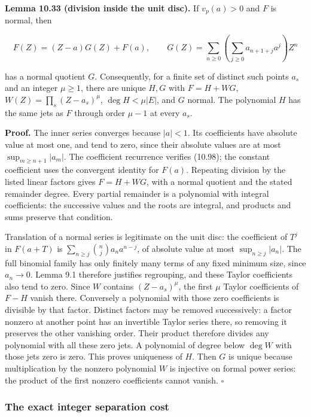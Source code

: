\documentclass[
  11pt,
  a4paper,
]{article}
\begin{document}
\textbf{Lemma 10.33 (division inside the unit disc).} If \(v_p(a)>0\)
and \(F\) is normal, then

\[
F(Z)=(Z-a)G(Z)+F(a),\qquad
G(Z)=\sum_{n\ge0}\left(\sum_{j\ge0}a_{n+1+j}a^j\right)Z^n
\tag{10.98}
\]

has a normal quotient \(G\). Consequently, for a finite set of distinct
such points \(a_s\) and an integer \(\mu\ge1\), there are unique \(H,G\)
with \(F=H+WG\), \(W(Z)=\prod_s(Z-a_s)^\mu\), \(\deg H<\mu|E|\), and
\(G\) normal. The polynomial \(H\) has the same jets as \(F\) through
order \(\mu-1\) at every \(a_s\).

\textbf{Proof.} The inner series converges because \(|a|<1\). Its
coefficients have absolute value at most one, and tend to zero, since
their absolute values are at most \(\sup_{m\ge n+1}|a_m|\). The
coefficient recurrence verifies (10.98); the constant coefficient uses
the convergent identity for \(F(a)\). Repeating division by the listed
linear factors gives \(F=H+WG\), with a normal quotient and the stated
remainder degree. Every partial remainder is a polynomial with integral
coefficients: the successive values and the roots are integral, and
products and sums preserve that condition.

Translation of a normal series is legitimate on the unit disc: the
coefficient of \(T^j\) in \(F(a+T)\) is
\(\sum_{n\ge j}\binom nj a_n a^{n-j}\), of absolute value at most
\(\sup_{n\ge j}|a_n|\). The full binomial family has only finitely many
terms of any fixed minimum size, since \(a_n\to0\). Lemma 9.1 therefore
justifies regrouping, and these Taylor coefficients also tend to zero.
Since \(W\) contains \((Z-a_s)^\mu\), the first \(\mu\) Taylor
coefficients of \(F-H\) vanish there. Conversely a polynomial with those
zero coefficients is divisible by that factor. Distinct factors may be
removed successively: a factor nonzero at another point has an
invertible Taylor series there, so removing it preserves the other
vanishing order. Their product therefore divides any polynomial with all
these zero jets. A polynomial of degree below \(\deg W\) with those jets
zero is zero. This proves uniqueness of \(H\). Then \(G\) is unique
because multiplication by the nonzero polynomial \(W\) is injective on
formal power series: the product of the first nonzero coefficients
cannot vanish. \(\square\)

\subsubsection{The exact integer separation
cost}\label{the-exact-integer-separation-cost}
\end{document}
